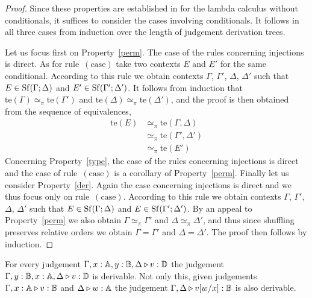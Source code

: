 \begin{proof}
Since these properties are established in \cite[Theorem 2.3]{dahlqvist2023complete} for the lambda calculus without conditionals,  it suffices to consider the cases involving conditionals.
It follows in all three cases from induction over the length of judgement derivation
trees. 

Let us focus first on Property~\eqref{perm}. The case of the rules concerning
injections is direct. As for rule~$(\text{case})$ take two contexts $E$ and
$E'$ for the same conditional. According to this rule we obtain contexts
$\Gamma$, $\Gamma'$, $\Delta$, $\Delta'$ such that $E \in
\mathrm{Sf}(\Gamma;\Delta)$ and $E' \in \mathrm{Sf}(\Gamma';\Delta')$. It follows from
induction that  $\text{te}(\Gamma) \simeq_\pi \text{te}(\Gamma')$ and $\text{te}(\Delta) \simeq_\pi \text{te}(\Delta')$,
and the proof is then obtained from the sequence of equivalences,
\begin{align*}
        \text{te}(E) & \simeq_\pi \text{te}(\Gamma, \Delta) 
        \\
        & \simeq_\pi \text{te}(\Gamma', \Delta')
        \\
        & \simeq_\pi \text{te}(E')
\end{align*}
Concerning Property~\eqref{type}, the case of the rules concerning injections
is direct and the case of rule~$(\text{case})$ is a corollary of
Property~\eqref{perm}. Finally let us consider Property~\eqref{der}. Again the
case concerning injections is direct and we thus focus only on
rule~$(\text{case})$. According to this rule we obtain contexts $\Gamma$,
$\Gamma'$, $\Delta$, $\Delta'$ such that $E \in \mathrm{Sf}(\Gamma;\Delta)$ and $E
\in \mathrm{Sf}(\Gamma';\Delta')$. By an appeal to Property~\eqref{perm} we also
obtain $\Gamma \simeq_\pi \Gamma'$ and $\Delta \simeq_\pi \Delta'$, and thus
since shuffling preserves relative orders we obtain $\Gamma = \Gamma'$ and
$\Delta = \Delta'$. The proof then follows by induction.
\end{proof}


\begin{lemma}
\label{lem:exh_and_sub} 
For every judgement $\Gamma,x: \mathbb{A}, y: \mathbb{B}, \Delta \triangleright v: \mathbb{D}$ the
judgement $\Gamma, y:\mathbb{B}, x:\mathbb{A}, \Delta \triangleright v:
\mathbb{D}$ is derivable. Not only this, given judgements  $\Gamma,x:\mathbb{A} \triangleright
v: \mathbb{B}$ and $\Delta \triangleright w: \mathbb{A}$ the judgement $\Gamma, \Delta \triangleright
v[w/x]: \mathbb{B}$ is also derivable.
\end{lemma}

